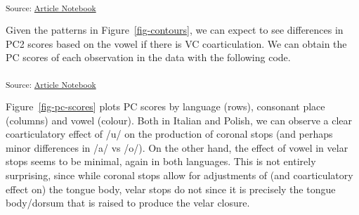 \documentclass[
  man,
  longtable,
  nolmodern,
  notxfonts,
  notimes,
  colorlinks=true,linkcolor=blue,citecolor=blue,urlcolor=blue]{apa7}
\newenvironment{Shaded}{\begin{snugshade}}{\end{snugshade}}
\newcommand{\AttributeTok}[1]{\textcolor[rgb]{0.40,0.45,0.13}{#1}}
\newcommand{\DecValTok}[1]{\textcolor[rgb]{0.68,0.00,0.00}{#1}}
\newcommand{\FunctionTok}[1]{\textcolor[rgb]{0.28,0.35,0.67}{#1}}
\newcommand{\NormalTok}[1]{\textcolor[rgb]{0.00,0.23,0.31}{#1}}
\newcommand{\OtherTok}[1]{\textcolor[rgb]{0.00,0.23,0.31}{#1}}
\newcommand{\SpecialCharTok}[1]{\textcolor[rgb]{0.37,0.37,0.37}{#1}}
\newcommand{\StringTok}[1]{\textcolor[rgb]{0.13,0.47,0.30}{#1}}
\begin{document}
\textsubscript{Source:
\href{https://stefanocoretta.github.io/mv_uti/index.qmd.html}{Article
Notebook}}

Given the patterns in Figure~\ref{fig-contours}, we can expect to see
differences in PC2 scores based on the vowel if there is VC
coarticulation. We can obtain the PC scores of each observation in the
data with the following code.

\begin{Shaded}
\end{Shaded}

\textsubscript{Source:
\href{https://stefanocoretta.github.io/mv_uti/index.qmd.html}{Article
Notebook}}

Figure~\ref{fig-pc-scores} plots PC scores by language (rows), consonant
place (columns) and vowel (colour). Both in Italian and Polish, we can
observe a clear coarticulatory effect of /u/ on the production of
coronal stops (and perhaps minor differences in /a/ vs /o/). On the
other hand, the effect of vowel in velar stops seems to be minimal,
again in both languages. This is not entirely surprising, since while
coronal stops allow for adjustments of (and coarticulatory effect on)
the tongue body, velar stops do not since it is precisely the tongue
body/dorsum that is raised to produce the velar closure.
\end{document}
